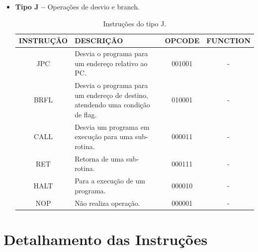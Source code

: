 \documentclass{report}
\begin{document}
\begin{itemize}
    \item \textbf{Tipo J --} Operações de desvio e branch.
    
	\begin{table}[H]
	\centering
	\begin{tabular}{|c|m{6cm}|c|c|}
  	\hline 
  	\textbf{INSTRUÇÃO} & \textbf{DESCRIÇÃO} & \textbf{OPCODE} & \textbf{FUNCTION} \\ 
  	\hline 

  	JPC & Desvia o programa para um endereço relativo ao PC. & 001001 & - \\ \hline
  	BRFL & Desvia o programa para um endereço de destino, atendendo uma condição de flag. & 010001 & - \\ \hline
  	CALL & Desvia um programa em execução para uma sub-rotina. & 000011 & - \\ \hline
  	RET & Retorna de uma sub-rotina. & 000111 & - \\ \hline
  	HALT & Para a execução de um programa. & 000010 & - \\ \hline
  	NOP & Não realiza operação. & 000001 & - \\ \hline

  	\end{tabular} 
  	\caption{Instruções do tipo J.}
  \end{table}
    
    \end{itemize}

  \section{Detalhamento das Instruções}
  
\end{document}
